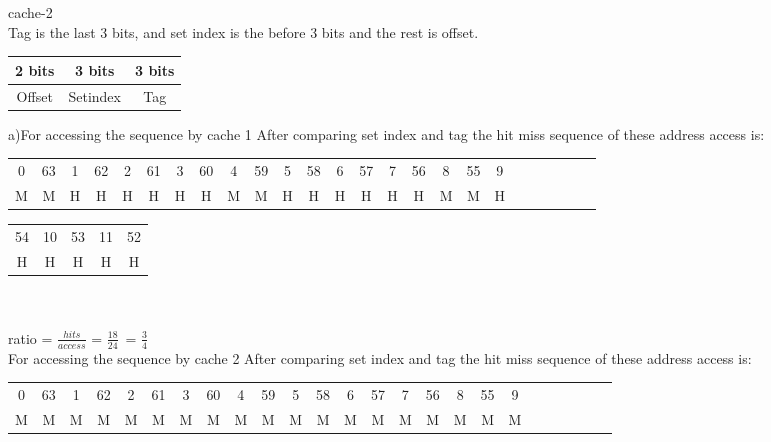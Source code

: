 \documentclass[12pt]{article}
\begin{document}
cache-2\\
Tag is the last 3 bits, and set index is the before 3 bits and the rest is offset.
\begin{center}
	\begin{tabular}{ |c|c|c| } 
		\hline
		2 bits & 3 bits & 3 bits \\ 
		\hline
	    Offset & Setindex & Tag \\  
		\hline
	\end{tabular}
\end{center}
a)For accessing the sequence by cache 1 
After comparing set index and tag the hit miss sequence of these address access is:\\


\begin{center}
	\begin{tabular}{ |c|c|c|c|c|c|c|c|c|c|c|c|c|c|c|c|c|c|c|c|c|c|c|c|c| } 
	\hline
		0 & 63 & 1& 62 & 2 & 61 & 3 & 60 & 4 & 59 & 5 & 58 & 6 & 57 & 7 & 56 & 8 & 55  & 9   \\ 
		
		M&M&H&H&H&H&H&H&M&M&H&H&H&H&H&H&M&M&H \\  
		\hline
	\end{tabular}
\end{center}


	\begin{tabular}{ |c|c|c| c|c|} 
		\hline
		 54 & 10 & 53 & 11 & 52 \\ 
		 
		H&H&H&H&H \\ 
	 
		\hline
	\end{tabular}\\
\\
ratio  =
\(\frac{hits}{access}\) =
\(\frac{18}{24}\)\      =
\(\frac{3}{4}\)\     \\

For accessing the sequence by cache 2
After comparing set index and tag the hit miss sequence of these address access is:\\


\begin{center}
	\begin{tabular}{ |c|c|c|c|c|c|c|c|c|c|c|c|c|c|c|c|c|c|c|c|c|c|c|c|c| } 
		\hline
		0 & 63 & 1& 62 & 2 & 61 & 3 & 60 & 4 & 59 & 5 & 58 & 6 & 57 & 7 & 56 & 8 & 55  & 9   \\ 
		
		M&M&M&M&M&M&M&M&M&M&M&M&M&M&M&M&M&M&M \\  
		\hline
	\end{tabular}
\end{center}
\end{document}
